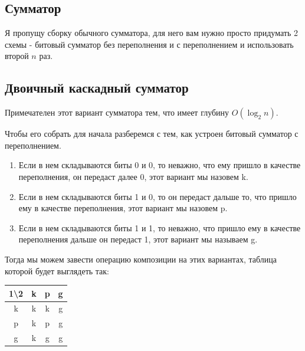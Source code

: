 
\subsection{Сумматор}
Я пропущу сборку обычного сумматора, для него вам нужно просто придумать 2 схемы - битовый сумматор без переполнения и с переполнением и использовать второй $n$ раз.

\subsection{Двоичный каскадный сумматор}
Примечателен этот вариант сумматора тем, что имеет глубину $O(\log_2n)$. 

Чтобы его собрать для начала разберемся с тем, как устроен битовый сумматор с переполнением. 
\begin{enumerate}
    \item Если в нем складываются биты 0 и 0, то неважно, что ему пришло в качестве переполнения, он передаст далее 0, этот вариант мы назовем k.
    \item Если в нем складываются биты 1 и 0, то он передаст дальше то, что пришло ему в качестве переполнения, этот вариант мы назовем p.
    \item Если в нем складываются биты 1 и 1, то неважно, что пришло ему в качестве переполнения дальше он передаст 1, этот вариант мы называем g. 
\end{enumerate}

Тогда мы можем завести операцию композиции на этих вариантах, таблица которой будет выглядеть так:
\begin{center}
    \begin{tabular}{ |c|c|c|c| }
        \hline
         1\textbackslash2 & k & p & g \\
        \hline
         k & k & k & g \\
        \hline
         p & k & p & g \\
        \hline
         g & k & g & g \\
        \hline
    \end{tabular}
\end{center}

